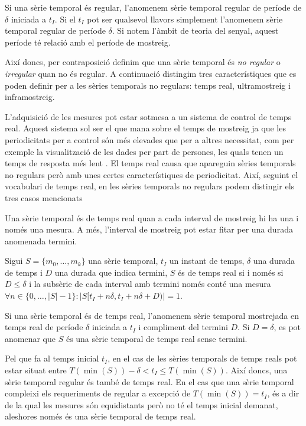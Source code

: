 Si una sèrie temporal és regular, l'anomenem sèrie temporal regular de
període de $\delta$ iniciada a $t_I$. Si el $t_I$ pot ser qualsevol
llavors simplement l'anomenem sèrie temporal regular de període
$\delta$.  Si notem l'àmbit de teoria del senyal, aquest període té
relació amb el període de mostreig.


Així doncs, per contraposició definim que una sèrie temporal és
\emph{no regular} o \emph{irregular} quan no és regular.  A
continuació distingim tres característiques que es poden definir per a les
sèries temporals no regulars: temps real, ultramostreig i
inframostreig.

L'adquisició de les mesures pot estar sotmesa a un sistema de
control de temps real. Aquest sistema sol ser el que mana sobre el
temps de mostreig ja que les periodicitats per a control són més
elevades que per a altres necessitat, com per exemple la visualització
de les dades per part de persones, les quals tenen un temps de
resposta més lent \parencite[cap.~1]{kopetz11:realtime}.  El temps
real causa que apareguin sèries temporals no regulars però amb unes
certes característiques de periodicitat.  Així, seguint el vocabulari
de temps real, en les sèries temporals no regulars podem distingir els
tres casos mencionats


Una sèrie temporal és de temps real quan a cada interval de mostreig
hi ha una i només una mesura. A més, l'interval de mostreig pot estar
fitar per una durada anomenada termini.
\begin{definition}
  \label{def:st:tempsreal}
  Sigui $S=\{m_0,\dotsc,m_k\}$ una sèrie temporal, $t_I$ un instant de
  temps, $\delta$ una durada de temps i $D$ una durada que indica
  termini, $S$ és de temps real si i només si $D\leq\delta$ i la
  subsèrie de cada interval amb termini només conté una mesura $\forall
  n\in\{0,\ldots,|S|-1\}: |S[t_I+n\delta,t_I+n\delta+D)| = 1$.
\end{definition}

Si una sèrie temporal és de temps real, l'anomenem sèrie temporal
mostrejada en temps real de període $\delta$ iniciada a $t_I$ i
compliment del termini $D$.  Si $D=\delta$, es pot anomenar que $S$ és
una sèrie temporal de temps real sense termini.

Pel que fa al temps inicial $t_I$, en el cas de les sèries temporals
de temps reals pot estar situat entre $T(\min(S))-\delta < t_I \leq
T(\min(S))$.  Així doncs, una sèrie temporal regular és també de temps
real. En el cas que una sèrie temporal compleixi els requeriments de
regular a excepció de $T(\min(S))=t_I$, és a dir de la qual les
mesures són equidistants però no té el temps inicial demanat,
aleshores només és una sèrie temporal de temps real.



